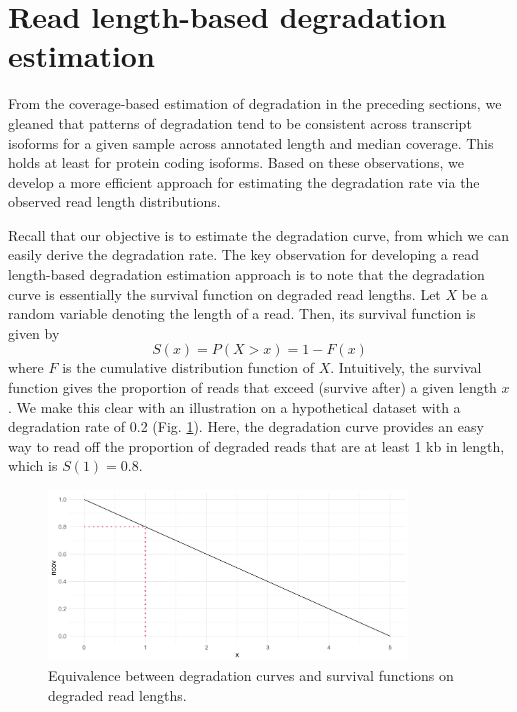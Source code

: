 \section{Read length-based degradation estimation}\label{sec:rld}

From the coverage-based estimation of degradation in the preceding sections, we gleaned that patterns of degradation tend to be consistent across transcript isoforms for a given sample across annotated length and median coverage. This holds at least for protein coding isoforms. Based on these observations, we develop a more efficient approach for estimating the degradation rate via the observed read length distributions.

Recall that our objective is to estimate the degradation curve, from which we can easily derive the degradation rate. The key observation for developing a read length-based degradation estimation approach is to note that the degradation curve is essentially the survival function on degraded read lengths. Let $X$ be a random variable denoting the length of a read. Then, its survival function is given by 
\begin{equation}
    S(x)=P(X>x)=1-F(x)
\end{equation}
where $F$ is the cumulative distribution function of $X$. Intuitively, the survival function gives the proportion of reads that exceed (survive after) a given length $x$. We make this clear with an illustration on a hypothetical dataset with a degradation rate of 0.2 (Fig. \ref{fig:survival}). Here, the degradation curve provides an easy way to read off the proportion of degraded reads that are at least 1 kb in length, which is $S(1)=0.8$.   

\begin{figure}[H]
    \centering
    \includegraphics[width=0.85\textwidth]{figures/sec-2-length-example.png}
    \caption[Equivalence between degradation curves and survival functions]{Equivalence between degradation curves and survival functions on degraded read lengths.}
    \label{fig:survival}
\end{figure}

